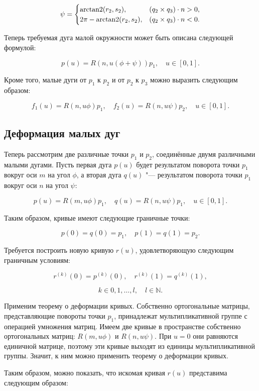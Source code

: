 \begin{equation}
\psi=
 \begin{cases}
   \operatorname{arctan2}(r_2,s_2),      & (q_2\times q_3)\cdot n>0, \\
   2\pi-\operatorname{arctan2}(r_2,s_2), & (q_2\times q_3)\cdot n<0.
 \end{cases}
\label{two-dimension-sphere-psi-angle}
\end{equation}

Теперь требуемая дуга малой окружности может быть описана следующей формулой:

$$
p(u)=R(n,u(\phi+\psi))p_1, \quad u \in [0,1].
$$

Кроме того, малые дуги от $p_1$ к $p_2$ и от $p_2$ к $p_3$ можно выразить следующим образом:

$$
f_1(u)=R(n,u\phi)p_1, \quad f_2(u)=R(n,u\psi)p_2, \quad u \in [0,1].
$$

\subsection*{Деформация малых дуг}

Теперь рассмотрим две различные точки $p_1$ и $p_2$, соединённые двумя различными малыми дугами. Пусть первая дуга
$p(u)$ будет результатом поворота точки $p_1$ вокруг оси $m$ на угол $\phi$, а вторая дуга $q(u)$ "--- результатом
поворота точки $p_1$ вокруг оси $n$ на угол $\psi$:

$$
p(u)=R(m,u\phi)p_1, \quad q(u)=R(n,u\psi)p_1, \quad u \in [0,1].
$$

Таким образом, кривые имеют следующие граничные точки:

$$
p(0)=q(0)=p_1, \quad p(1)=q(1)=p_2.
$$

Требуется построить новую кривую $r(u)$, удовлетворяющую следующим граничным условиям:

$$
r^{(k)}(0)=p^{(k)}(0), \quad r^{(k)}(1)=q^{(k)}(1),
$$

$$
k \in {0,1,\dots,l}, \quad l \in \mathbb{N}.
$$

Применим теорему о деформации кривых. Собственно ортогональные матрицы, представляющие повороты
точки $p_1$, принадлежат мультипликативной группе с операцией умножения матриц. Имеем две кривые в пространстве
собственно ортогональных матриц: $R(m,u\phi)$ и $R(n,u\psi)$. При $u=0$ они равняются единичной матрице, поэтому эти
кривые выходят из единицы мультипликативной группы. Значит, к ним можно применить теорему о деформации кривых.

Таким образом, можно показать, что искомая кривая $r(u)$ представима следующим образом:


